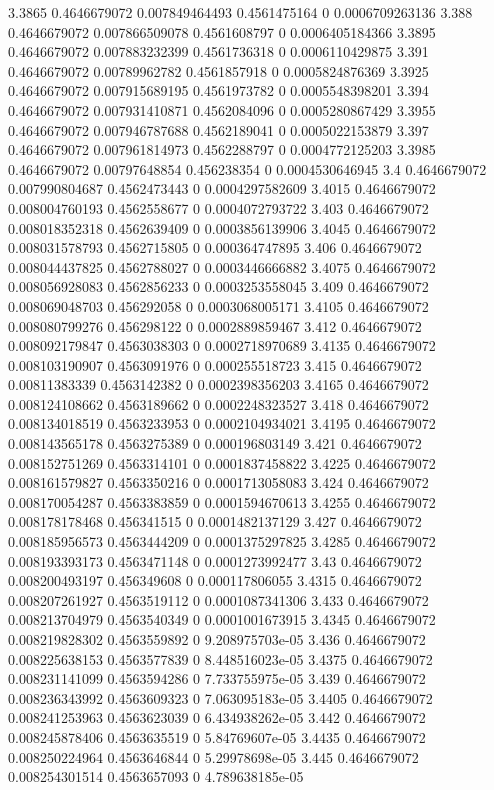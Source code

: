 {3.3865 0.4646679072 0.007849464493 0.4561475164 0 0.0006709263136
3.388 0.4646679072 0.007866509078 0.4561608797 0 0.0006405184366
3.3895 0.4646679072 0.007883232399 0.4561736318 0 0.0006110429875
3.391 0.4646679072 0.00789962782 0.4561857918 0 0.0005824876369
3.3925 0.4646679072 0.007915689195 0.4561973782 0 0.0005548398201
3.394 0.4646679072 0.007931410871 0.4562084096 0 0.0005280867429
3.3955 0.4646679072 0.007946787688 0.4562189041 0 0.0005022153879
3.397 0.4646679072 0.007961814973 0.4562288797 0 0.0004772125203
3.3985 0.4646679072 0.00797648854 0.456238354 0 0.0004530646945
3.4 0.4646679072 0.007990804687 0.4562473443 0 0.0004297582609
3.4015 0.4646679072 0.008004760193 0.4562558677 0 0.0004072793722
3.403 0.4646679072 0.008018352318 0.4562639409 0 0.0003856139906
3.4045 0.4646679072 0.008031578793 0.4562715805 0 0.000364747895
3.406 0.4646679072 0.008044437825 0.4562788027 0 0.0003446666882
3.4075 0.4646679072 0.008056928083 0.4562856233 0 0.0003253558045
3.409 0.4646679072 0.008069048703 0.456292058 0 0.0003068005171
3.4105 0.4646679072 0.008080799276 0.456298122 0 0.0002889859467
3.412 0.4646679072 0.008092179847 0.4563038303 0 0.0002718970689
3.4135 0.4646679072 0.008103190907 0.4563091976 0 0.000255518723
3.415 0.4646679072 0.00811383339 0.4563142382 0 0.0002398356203
3.4165 0.4646679072 0.008124108662 0.4563189662 0 0.0002248323527
3.418 0.4646679072 0.008134018519 0.4563233953 0 0.0002104934021
3.4195 0.4646679072 0.008143565178 0.4563275389 0 0.000196803149
3.421 0.4646679072 0.008152751269 0.4563314101 0 0.0001837458822
3.4225 0.4646679072 0.008161579827 0.4563350216 0 0.0001713058083
3.424 0.4646679072 0.008170054287 0.4563383859 0 0.0001594670613
3.4255 0.4646679072 0.008178178468 0.456341515 0 0.0001482137129
3.427 0.4646679072 0.008185956573 0.4563444209 0 0.0001375297825
3.4285 0.4646679072 0.008193393173 0.4563471148 0 0.0001273992477
3.43 0.4646679072 0.008200493197 0.456349608 0 0.000117806055
3.4315 0.4646679072 0.008207261927 0.4563519112 0 0.0001087341306
3.433 0.4646679072 0.008213704979 0.4563540349 0 0.0001001673915
3.4345 0.4646679072 0.008219828302 0.4563559892 0 9.208975703e-05
3.436 0.4646679072 0.008225638153 0.4563577839 0 8.448516023e-05
3.4375 0.4646679072 0.008231141099 0.4563594286 0 7.733755975e-05
3.439 0.4646679072 0.008236343992 0.4563609323 0 7.063095183e-05
3.4405 0.4646679072 0.008241253963 0.4563623039 0 6.434938262e-05
3.442 0.4646679072 0.008245878406 0.4563635519 0 5.84769607e-05
3.4435 0.4646679072 0.008250224964 0.4563646844 0 5.29978698e-05
3.445 0.4646679072 0.008254301514 0.4563657093 0 4.789638185e-05
}
